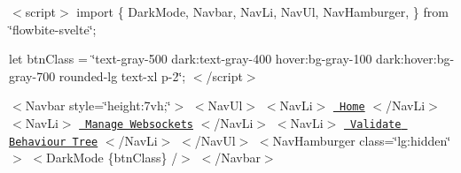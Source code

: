 $<$script$>$ import \{ Dark\+Mode, Navbar, Nav\+Li, Nav\+Ul, Nav\+Hamburger, \} from \char`\"{}flowbite-\/svelte\char`\"{};

let btn\+Class = \char`\"{}text-\/gray-\/500 dark\+:text-\/gray-\/400 hover\+:bg-\/gray-\/100 dark\+:hover\+:bg-\/gray-\/700 rounded-\/lg text-\/xl p-\/2\char`\"{}; $<$/script$>$

$<$\+Navbar style=\char`\"{}height\+:7vh;\char`\"{}$>$ $<$\+Nav\+Ul$>$ $<$\+Nav\+Li$>$ \href{\#/}{\texttt{ Home}} $<$/\+Nav\+Li$>$ $<$\+Nav\+Li$>$ \href{\#/websocket}{\texttt{ Manage Websockets}} $<$/\+Nav\+Li$>$ $<$\+Nav\+Li$>$ \href{\#/validate}{\texttt{ Validate Behaviour Tree}} $<$/\+Nav\+Li$>$ $<$/\+Nav\+Ul$>$ $<$\+Nav\+Hamburger class=\char`\"{}lg\+:hidden\char`\"{} $>$ \texorpdfstring{$<$}{<}Dark\+Mode \{btn\+Class\} /\texorpdfstring{$>$}{>} $<$/\+Navbar$>$ 